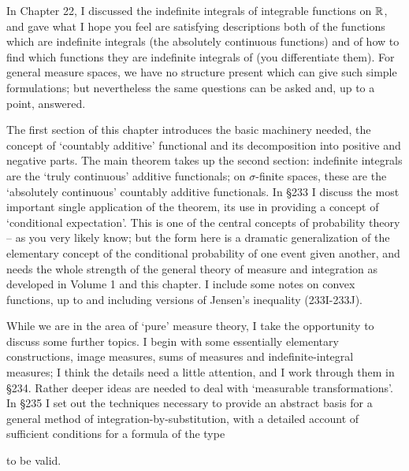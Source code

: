 

\def\chaptername{The Radon-Nikod\'ym Theorem}
\def\chaptername{The Radon-Nikod\'ym theorem}

In Chapter 22, I discussed the indefinite integrals of
integrable functions on $\Bbb R$, and gave what I hope you feel are
satisfying descriptions both of
the functions which are indefinite integrals (the absolutely
continuous functions) and of how to find which functions they are
indefinite integrals of (you differentiate them).   For general measure
spaces, we have no structure present which can give such simple
formulations;  but nevertheless the same questions can be asked and, up
to a point, answered.

The first section of this chapter introduces the basic machinery needed,
the concept of `countably additive' functional and its decomposition
into positive and negative parts.   The main theorem takes up the second
section:  indefinite integrals are the `truly continuous' additive
functionals;  on $\sigma$-finite spaces, these are the `absolutely
continuous' countably additive functionals.   In \S233 I discuss the
most important single application of the theorem, its use in providing a
concept of `conditional expectation'.   This is one of the central
concepts of probability theory -- as you very likely know;  but the form
here is a dramatic generalization of the elementary concept of the
conditional probability of one event given another, and needs the whole
strength of the general theory of measure and integration as developed
in Volume 1 and this chapter.   I include some notes on convex
functions, up to and including versions of Jensen's inequality
(233I-233J).

While we are in the area of `pure' measure theory, I take the opportunity 
to discuss some further topics.
I begin with some essentially elementary constructions,
image measures, sums of measures and indefinite-integral measures;
I think the details need a little attention,
and I work through them in \S234.
Rather deeper ideas are needed to deal with `measurable
transformations'.   In \S235 I set out the techniques necessary to provide an
abstract basis for a general method of integration-by-substitution, with
a detailed account of sufficient conditions for a formula of the type


\noindent to be valid.

\discrpage
